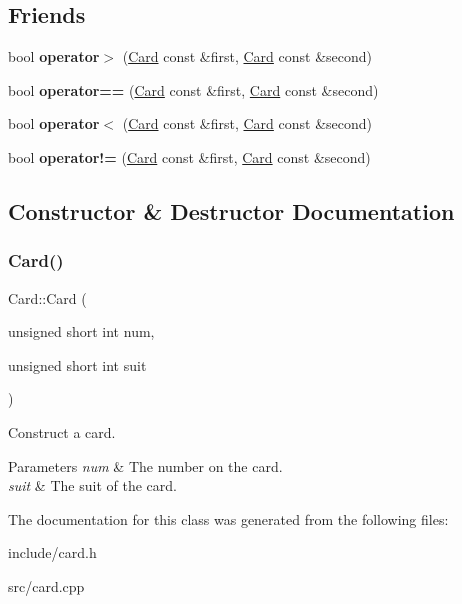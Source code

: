 \subsection*{Friends}
\begin{DoxyCompactItemize}
\item 
\mbox{\label{classCard_a5096257ae9d8273d4e47696c3faca770}} 
bool {\bfseries operator$>$} (\hyperlink{classCard}{Card} const \&first, \hyperlink{classCard}{Card} const \&second)
\item 
\mbox{\label{classCard_afe1cba0ed977eb5280d029f96b6da9cc}} 
bool {\bfseries operator==} (\hyperlink{classCard}{Card} const \&first, \hyperlink{classCard}{Card} const \&second)
\item 
\mbox{\label{classCard_a31c8c978ffb63cefe2bfe64b51644bad}} 
bool {\bfseries operator$<$} (\hyperlink{classCard}{Card} const \&first, \hyperlink{classCard}{Card} const \&second)
\item 
\mbox{\label{classCard_ae485e3400764685f4d5fc1cdb77b9030}} 
bool {\bfseries operator!=} (\hyperlink{classCard}{Card} const \&first, \hyperlink{classCard}{Card} const \&second)
\end{DoxyCompactItemize}


\subsection{Constructor \& Destructor Documentation}
\mbox{\label{classCard_ab1406a01ecfea3110f8e6188e11c4863}} 
\subsubsection{\texorpdfstring{Card()}{Card()}}
{\footnotesize\ttfamily Card\+::\+Card (\begin{DoxyParamCaption}\item[{unsigned short int}]{num,  }\item[{unsigned short int}]{suit }\end{DoxyParamCaption})}



Construct a card. 


\begin{DoxyParams}{Parameters}
{\em num} & The number on the card. \\
\hline
{\em suit} & The suit of the card. \\
\hline
\end{DoxyParams}


The documentation for this class was generated from the following files\+:\begin{DoxyCompactItemize}
\item 
include/card.\+h\item 
src/card.\+cpp\end{DoxyCompactItemize}
